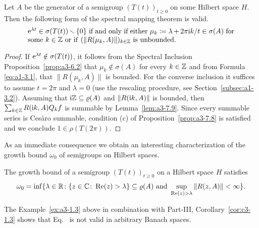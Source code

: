 \begin{theorem}\label{thm:a3-7.10}
%
Let $A$ be the generator of a semigroup $(T(t))_{t\geq 0}$ on some Hilbert space $H$.
Then the following form of the spectral mapping theorem is valid.
\[
\begin{minipage}{.85\textwidth}
	$ \eu^{\lambda t} \in \sigma(T(t))\setminus\{0\} $ if and only if either 
	$\mu_{k}\coloneq \lambda + 2\pi\im  k/t \in \sigma(A)$ for some  $k \in \Z$
	or if\/ $(\|R(\mu_{k},A)\|)_{k\in\Z}$ is unbounded.
\end{minipage}
\]
\end{theorem}
\begin{proof}
If\/ $\mathrm{e}^{\lambda t} \notin \sigma(T(t))$, it follows from the Spectral Inclusion Proposition~\ref{prop:a3-6.2} that $\mu_{k} \notin \sigma(A)$ for every $k \in \mathbb{Z}$ and from Formula \eqref{eq:a1-3.1},  that $\|R(\mu_{k},A)\|$ is bounded.
For the converse inclusion it suffices to assume $t = 2\pi$ and $\lambda = 0$ (use the rescaling procedure, see Section~\ref{subsec:a1-3.2}).
Assuming that $\im\Z \subseteq \rho(A)$ and $\|R(\mathrm{i} k,A)\|$ is bounded, then $\sum_{k\in\mathbb{Z}} R(\mathrm{i} k,A)Q_{k}f$ is summable by Lemma~\ref{lem:a3-7.9}.
Since every summable series is Cesàro summable, condition (c) of Proposition~\ref{prop:a3-7.8} is satisfied and we conclude $1 \in \rho(T(2\pi))$.
\end{proof}
As an immediate consequence we obtain an interesting characterization of the growth bound $\omega_{0}$ of semigroups on Hilbert spaces.
\begin{corollary}\label{cor:a3-7.11}
%
The growth bound 
of a semigroup $(T(t))_{t\geq 0}$ on a Hilbert space $H$ satisfies
\begin{equation}\label{eq:a3-7.9}
\omega_{0} = \inf \{\lambda \in \R \colon \{z \in \C \colon \Re(z) > \lambda\} \subseteq \rho(A) \text{ and } \sup_{\Re(z) > \lambda}\|R(z,A)\| < \infty\} .
\end{equation}
\end{corollary}
The Example~\ref{ex:a3-1.3} above in combination with Part-III, Corollary~\ref{cor:c3-1.3} shows that Eq.~ is not valid in arbitrary Banach spaces.
